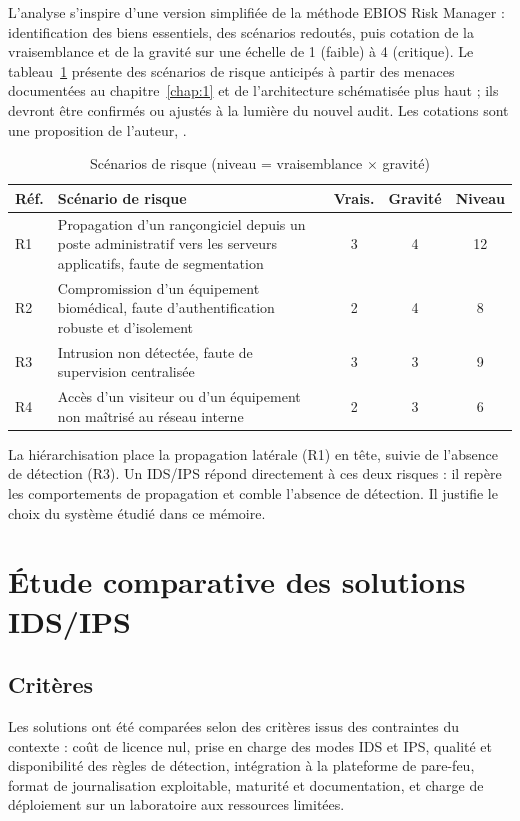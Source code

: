 L'analyse s'inspire d'une version simplifiée de la méthode EBIOS Risk Manager : identification des biens essentiels, des scénarios redoutés, puis cotation de la vraisemblance et de la gravité sur une échelle de 1 (faible) à 4 (critique). Le tableau~\ref{tab:risques} présente des scénarios de risque anticipés à partir des menaces documentées au chapitre~\ref{chap:1} et de l'architecture schématisée plus haut ; ils devront être confirmés ou ajustés à la lumière du nouvel audit. Les cotations sont une proposition de l'auteur, .

\begin{table}[htbp]
\centering
\small
\begin{tabularx}{\textwidth}{lXccc}
\hline
\textbf{Réf.} & \textbf{Scénario de risque} & \textbf{Vrais.} & \textbf{Gravité} & \textbf{Niveau} \\
\hline
R1 & Propagation d'un rançongiciel depuis un poste administratif vers les serveurs applicatifs, faute de segmentation & 3 & 4 & 12 \\
R2 & Compromission d'un équipement biomédical, faute d'authentification robuste et d'isolement & 2 & 4 & 8 \\
R3 & Intrusion non détectée, faute de supervision centralisée & 3 & 3 & 9 \\
R4 & Accès d'un visiteur ou d'un équipement non maîtrisé au réseau interne & 2 & 3 & 6 \\
\hline
\end{tabularx}
\caption{Scénarios de risque (niveau = vraisemblance $\times$ gravité)}
\label{tab:risques}
\end{table}

La hiérarchisation place la propagation latérale (R1) en tête, suivie de l'absence de détection (R3). Un IDS/IPS répond directement à ces deux risques : il repère les comportements de propagation et comble l'absence de détection. Il justifie le choix du système étudié dans ce mémoire.

\section{Étude comparative des solutions IDS/IPS}

\subsection{Critères}

Les solutions ont été comparées selon des critères issus des contraintes du contexte : coût de licence nul, prise en charge des modes IDS et IPS, qualité et disponibilité des règles de détection, intégration à la plateforme de pare-feu, format de journalisation exploitable, maturité et documentation, et charge de déploiement sur un laboratoire aux ressources limitées.

